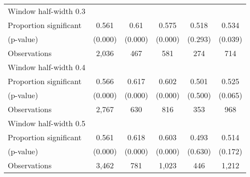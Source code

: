 \begin{tabular}{l*{5}{c}}
\hline
Window half-width 0.3\\

Proportion significant& 0.561 &  0.61 &  0.575 &  0.518 &  0.534\\

(p-value) & (0.000) &  (0.000) &  (0.000) &  (0.293) &  (0.039)\\

Observations& 2,036 &  467 &  581 &  274 &  714\\

\hline
Window half-width 0.4\\

Proportion significant& 0.566 &  0.617 &  0.602 &  0.501 &  0.525\\

(p-value) & (0.000) &  (0.000) &  (0.000) &  (0.500) &  (0.065)\\

Observations& 2,767 &  630 &  816 &  353 &  968\\

\hline
Window half-width 0.5\\

Proportion significant& 0.561 &  0.618 &  0.603 &  0.493 &  0.514\\

(p-value) & (0.000) &  (0.000) &  (0.000) &  (0.630) &  (0.172)\\

Observations& 3,462 &  781 &  1,023 &  446 &  1,212\\

\hline\hline
\end{tabular}

